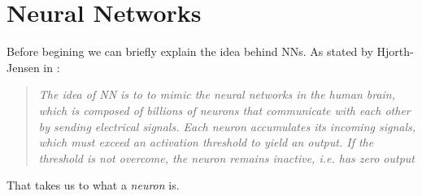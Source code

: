 \documentclass[14pt, a4paper]{book}
\begin{document}
\graphicspath{{../../figures/}}
\newpage
\section{Neural Networks}\label{sec:theory_nn}
Before begining we can briefly explain the idea behind NNs. As stated by Hjorth-Jensen in \cite{MORTYY1}:
\begin{quote}
    \textit{The idea of NN is to to mimic the neural networks in the human brain, which is composed of billions of neurons that communicate with each other by sending electrical signals. 
    Each neuron accumulates its incoming signals, which must exceed an activation threshold to yield an output. If the threshold is not overcome, the neuron remains inactive, i.e. has zero output}
\end{quote}
That takes us to what a \textit{neuron} is.
\end{document}
